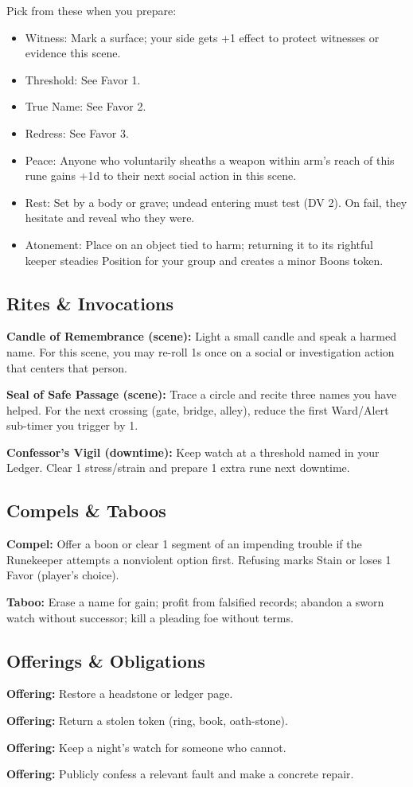 \documentclass[18pt, letterpaper, twoside]{article}
\newcommand{\rite}[2]{\noindent\textbf{#1:} #2\par}
\newcommand{\compel}[1]{\noindent\textbf{Compel:} #1\par}
\newcommand{\taboo}[1]{\noindent\textbf{Taboo:} #1\par}
\newcommand{\offering}[1]{\noindent\textbf{Offering:} #1\par}
\begin{document}
\begin{enumerate}
Pick from these when you prepare:
\begin{itemize}
    \item Witness: Mark a surface; your side gets +1 effect to protect witnesses or evidence this scene.
    \item Threshold: See Favor 1.
    \item True Name: See Favor 2.
    \item Redress: See Favor 3.
    \item Peace: Anyone who voluntarily sheaths a weapon within arm's reach of this rune gains +1d to their next social action in this scene.
    \item Rest: Set by a body or grave; undead entering must test (DV 2). On fail, they hesitate and reveal who they were.
    \item Atonement: Place on an object tied to harm; returning it to its rightful keeper steadies Position for your group and creates a minor Boons token.
\end{itemize}

\subsection{Rites \& Invocations}
\rite{Candle of Remembrance (scene)}{Light a small candle and speak a harmed name. For this scene, you may re-roll 1s once on a social or investigation action that centers that person.}
\rite{Seal of Safe Passage (scene)}{Trace a circle and recite three names you have helped. For the next crossing (gate, bridge, alley), reduce the first Ward/Alert sub-timer you trigger by 1.}
\rite{Confessor's Vigil (downtime)}{Keep watch at a threshold named in your Ledger. Clear 1 stress/strain and prepare 1 extra rune next downtime.}

\subsection{Compels \& Taboos}
\compel{Offer a boon or clear 1 segment of an impending trouble if the Runekeeper attempts a nonviolent option first. Refusing marks Stain or loses 1 Favor (player's choice).}
\taboo{Erase a name for gain; profit from falsified records; abandon a sworn watch without successor; kill a pleading foe without terms.}

\subsection{Offerings \& Obligations}
\offering{Restore a headstone or ledger page.}
\offering{Return a stolen token (ring, book, oath-stone).}
\offering{Keep a night's watch for someone who cannot.}
\offering{Publicly confess a relevant fault and make a concrete repair.}


\end{enumerate}
\end{document}
